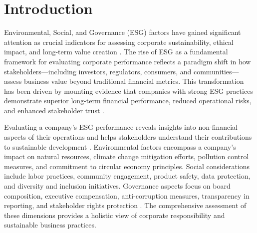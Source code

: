 \documentclass[12pt, letterpaper]{template}
\begin{document}



\section{Introduction}
Environmental, Social, and Governance (ESG) factors have gained significant attention as crucial indicators for assessing corporate sustainability, ethical impact, and long-term value creation \citep{Kiriu2020}. The rise of ESG as a fundamental framework for evaluating corporate performance reflects a paradigm shift in how stakeholders—including investors, regulators, consumers, and communities—assess business value beyond traditional financial metrics. This transformation has been driven by mounting evidence that companies with strong ESG practices demonstrate superior long-term financial performance, reduced operational risks, and enhanced stakeholder trust \citep{Aydomu2022}.

Evaluating a company's ESG performance reveals insights into non-financial aspects of their operations and helps stakeholders understand their contributions to sustainable development \citep{ebert}. Environmental factors encompass a company's impact on natural resources, climate change mitigation efforts, pollution control measures, and commitment to circular economy principles. Social considerations include labor practices, community engagement, product safety, data protection, and diversity and inclusion initiatives. Governance aspects focus on board composition, executive compensation, anti-corruption measures, transparency in reporting, and stakeholder rights protection \citep{Berg2019}. The comprehensive assessment of these dimensions provides a holistic view of corporate responsibility and sustainable business practices.
\end{document}
